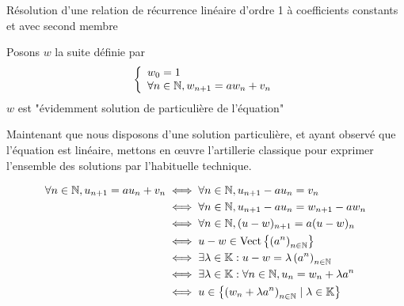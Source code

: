 \documentclass{article}
\renewenvironment{question_kholle}[2][ ]
{
	\subsection{\texorpdfstring{#2}{}}
	\notblank{#1}
	{
		\noindent #1
		\bigbreak
	}
	{}
	\begin{proof}
}
{
	\end{proof}
}
\begin{document}
\begin{question_kholle}
	[Soient $a \in \K$ et $v \in \K^\N$ où \K peut être \C ou \R.
		L'ensemble des solutions de l'équation $\forall n \in \N, u_{n+1} = au_{n} + v_{n}$
		est la droite affine :
		\begin{equation}
			\left\{ w + \lambda \left( a^n \right) _{n \in \N} \mid \lambda \in \K \right\}
		\end{equation}
	]
	{Résolution d'une relation de récurrence linéaire d'ordre 1 à coefficients constants et avec second membre}

	Posons $w$ la suite définie par $$
		\left\{ \begin{array}{ll}
			w_{0} = 1 \\
			\forall n \in \mathbb N, w_{n+1} = aw_{n} + v_{n}
		\end{array}\right.
	$$
	$w$ est "évidemment solution de particulière de l'équation"

	Maintenant que nous disposons d'une solution particulière, et ayant observé que l'équation est linéaire, mettons en œuvre l'artillerie classique pour exprimer l'ensemble des solutions par l'habituelle technique.


	\begin{align*}
		\forall n \in \mathbb N, u_{n+1} = au_{n} + v_{n} & \iff \forall n \in \mathbb N, u_{n+1} - au_{n} = v_{n}                                                 \\
		                                           & \iff \forall n \in \mathbb N, u_{n+1} - au_{n} = w_{n+1} - aw_{n}                                      \\
		                                           & \iff \forall n \in \mathbb N, (u-w)_{n+1} = a(u-w)_{n}                                                 \\
		                                           & \iff u-w \in \text{Vect}\left\{ \left( a^n \right) _{n \in \mathbb N} \right\}                         \\
		                                           & \iff \exists \lambda \in \mathbb K : u-w = \lambda \left( a^{n} \right) _{n \in \mathbb N}                    \\
		                                           & \iff \exists \lambda \in \mathbb K : \forall n \in \mathbb N, u_{n} = w_{n} + \lambda a^n                     \\
		                                           & \iff  u \in \left\{ \left( w_{n} + \lambda a^n \right) _{n \in \mathbb N} \mid \lambda \in \mathbb K \right\}
	\end{align*}

\end{question_kholle}
\end{document}
